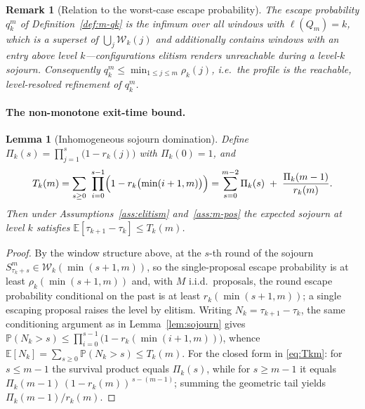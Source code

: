 \documentclass[11pt,a4paper]{article}
\newtheorem{lemma}[theorem]{Lemma}
\newtheorem{remark}[theorem]{Remark}
\newcommand{\E}{\mathbb{E}}
\newcommand{\Prob}{\mathbb{P}}
\begin{document}
\begin{remark}[Relation to the worst-case escape probability]
\label{rem:profile-vs-qkm}
  The escape probability $q_k^m$ of Definition~\ref{def:m-qk} is the
  infimum over \emph{all} windows with $\ell(Q_m)=k$, which is a superset
  of $\bigcup_j\mathcal W_k(j)$ and additionally contains windows with an
  entry \emph{above} level $k$---configurations elitism renders
  unreachable during a level-$k$ sojourn.  Consequently
  $q_k^m\le\min_{1\le j\le m}\rho_k(j)$, i.e.\ the profile is the
  reachable, level-resolved refinement of $q_k^m$.
\end{remark}

\paragraph{The non-monotone exit-time bound.}

\begin{lemma}[Inhomogeneous sojourn domination]\label{lem:nm-sojourn}
  Define $\Pi_k(s)=\prod_{j=1}^{s}\bigl(1-r_k(j)\bigr)$ with
  $\Pi_k(0)=1$, and
  \begin{equation}
    T_k(m)=\sum_{s\ge0}\ \prod_{i=0}^{s-1}\Bigl(1-r_k\bigl(\min(i+1,m)\bigr)\Bigr)
          =\sum_{s=0}^{m-2}\Pi_k(s)\;+\;\frac{\Pi_k(m-1)}{r_k(m)} .
    \label{eq:Tkm}
  \end{equation}
  Then under Assumptions~\ref{ass:elitism} and~\ref{ass:m-pos} the
  expected sojourn at level $k$ satisfies $\E[\tau_{k+1}-\tau_k]\le
  T_k(m)$.
\end{lemma}

\begin{proof}
  By the window structure above, at the $s$-th round of the sojourn
  $S^m_{\tau_k+s}\in\mathcal W_k(\min(s+1,m))$, so the single-proposal
  escape probability is at least $\rho_k(\min(s+1,m))$ and, with $M$
  i.i.d.\ proposals, the round escape probability conditional on the
  past is at least $r_k(\min(s+1,m))$; a single escaping proposal raises
  the level by elitism.  Writing $N_k=\tau_{k+1}-\tau_k$, the same
  conditioning argument as in Lemma~\ref{lem:sojourn} gives
  $\Prob(N_k>s)\le\prod_{i=0}^{s-1}\bigl(1-r_k(\min(i+1,m))\bigr)$, whence
  $\E[N_k]=\sum_{s\ge0}\Prob(N_k>s)\le T_k(m)$.  For the closed form in
  \eqref{eq:Tkm}: for $s\le m-1$ the survival product equals
  $\Pi_k(s)$, while for $s\ge m-1$ it equals
  $\Pi_k(m-1)\,(1-r_k(m))^{\,s-(m-1)}$; summing the geometric tail yields
  $\Pi_k(m-1)/r_k(m)$.
\end{proof}
\end{document}
